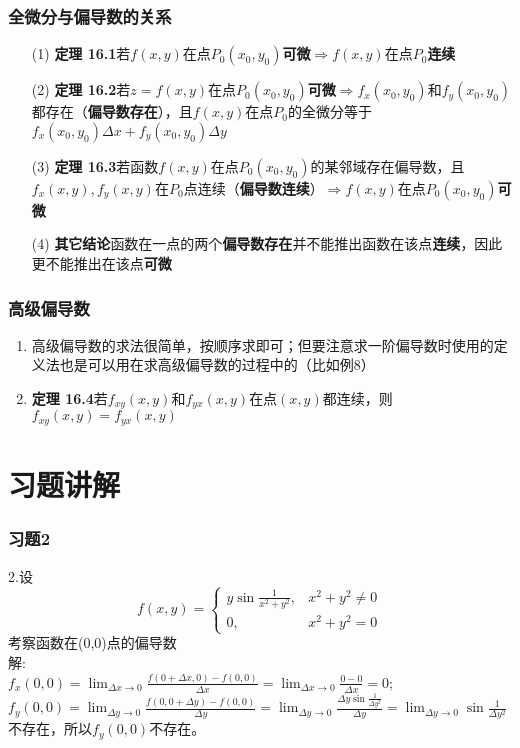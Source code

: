 \documentclass[xetex]{beamer}
\begin{document}
\begin{frame}
    \frametitle{全微分与偏导数的关系} 
    \begin{enumerate}
 	\item[(1)]\textbf{定理 16.1}\qquad 若$f(x,y)$在点$P_{0}(x_{0},y_{0})$\textbf{可微}$\Rightarrow f(x,y)$在点$P_{0}$\textbf{连续}
 	\item[(2)]\textbf{定理 16.2}\qquad 若$z=f(x,y)$在点$P_{0}(x_{0},y_{0})$\textbf{可微}$\Rightarrow f_{x}(x_{0},y_{0})$和$f_{y}(x_{0},y_{0})$都存在（\textbf{偏导数存在}），且$f(x,y)$在点$P_{0}$的全微分等于$f_{x}(x_{0},y_{0})\Delta x+f_{y}(x_{0},y_{0})\Delta y$
 	\item[(3)]\textbf{定理 16.3}\qquad 若函数$f(x,y)$在点$P_{0}(x_{0},y_{0})$的某邻域存在偏导数，且$f_{x}(x,y),f_{y}(x,y)$在$P_{0}$点连续（\textbf{偏导数连续}）$\Rightarrow f(x,y)$在点$P_{0}(x_{0},y_{0})$\textbf{可微}
 	\item[(4)]\textbf{其它结论}\qquad 函数在一点的两个\textbf{偏导数存在}并不能推出函数在该点\textbf{连续}，因此更不能推出在该点\textbf{可微}
    \end{enumerate}
  
\end{frame}

\begin{frame}
    \frametitle{高级偏导数} 
  \begin{enumerate}
\item 高级偏导数的求法很简单，按顺序求即可；但要注意求一阶偏导数时使用的定义法也是可以用在求高级偏导数的过程中的（比如例8）
\item \textbf{定理 16.4}\qquad 若$f_{xy}(x,y)$和$f_{yx}(x,y)$在点$(x,y)$都连续，则$f_{xy}(x,y)=f_{yx}(x,y)$
    \end{enumerate}
	
\end{frame}

\section{习题讲解}
\begin{frame}
    \frametitle{习题2} 
   2.设
$$
f(x,y)=
\left
\{\begin{array}{cc} 
		y\sin \frac{1}{x^2+y^2}, & x^2+y^2 \ne 0\\ 
		0, &  x^2+y^2 = 0
\end{array}\right.
$$ 
考察函数在(0,0)点的偏导数\\
解:\\
$f_{x}(0,0)=\displaystyle\lim_{\Delta x \to 0}\frac{f(0+\Delta x,0)-f(0,0)}{\Delta x}=\displaystyle\lim_{\Delta x \to 0} \frac{0-0}{\Delta x}=0$;\\
$f_{y}(0,0)=\displaystyle\lim_{\Delta y \to 0}\frac{f(0,0+\Delta y)-f(0,0)}{\Delta y}=\displaystyle\lim_{\Delta y \to 0} \frac{\Delta y\sin \frac{1}{\Delta y^2}}{\Delta y}=\displaystyle\lim_{\Delta y \to 0} \sin \frac{1}{\Delta y^2}$不存在，所以$f_{y}(0,0)$不存在。\\
\end{frame}
\end{document}
